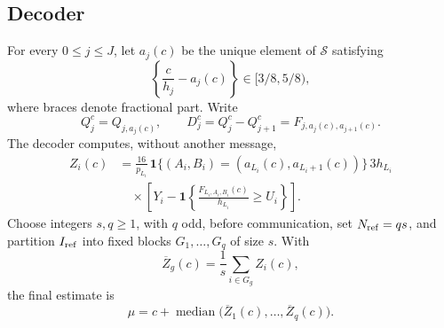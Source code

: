 \subsection{Decoder}

For every \(0\leq j\leq J\), let \(a_j(c)\) be the unique element of
\(\mathcal S\) satisfying
\[
\left\{\frac{c}{h_j}-a_j(c)\right\}\in[3/8,5/8),
\]
where braces denote fractional part.  Write
\[
Q_j^c=Q_{j,a_j(c)},\qquad
D_j^c=Q_j^c-Q_{j+1}^c
=F_{j,a_j(c),a_{j+1}(c)}.
\]
The decoder computes, without another message,
\[
\begin{split}
Z_i(c)
&=\frac{16}{p_{L_i}}\,
\mathbf1\{(A_i,B_i)=(a_{L_i}(c),a_{L_i+1}(c))\}\,3h_{L_i}\\
&\quad{}\times\left[
Y_i-\mathbf1\left\{
\frac{F_{L_i,A_i,B_i}(c)}{h_{L_i}}\geq U_i
\right\}\right].
\end{split}
\]
Choose integers \(s,q\geq1\), with \(q\) odd, before communication, set
\(N_{\rm ref}=qs\), and partition \(I_{\rm ref}\) into fixed blocks
\(G_1,\ldots,G_q\) of size \(s\).  With
\[
\overline Z_g(c)=\frac1s\sum_{i\in G_g}Z_i(c),
\]
the final estimate is
\[
\widehat\mu
=c+\operatorname{median}\bigl(
\overline Z_1(c),\ldots,\overline Z_q(c)\bigr).
\]

